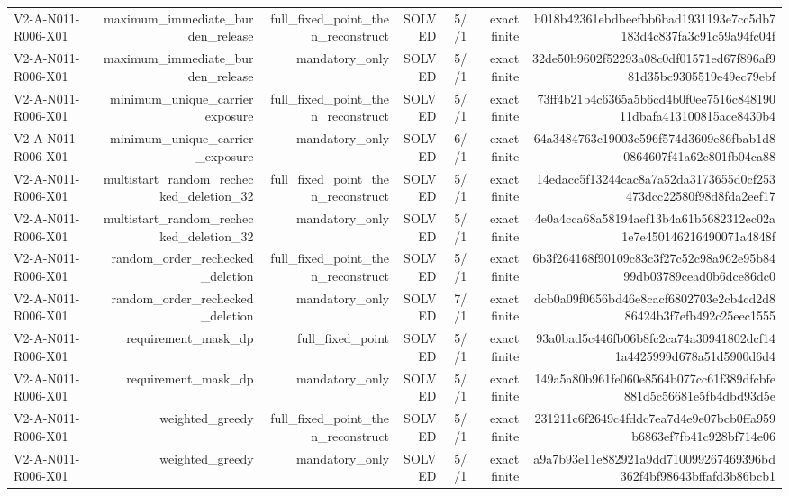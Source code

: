 {\begin{longtable}{lrrrrrr}
V2-A-N011-R006-X01 & maximum\_immediate\_burden\_release & full\_fixed\_point\_then\_reconstruct & SOLVED & 5//1 & exact finite & b018b42361ebdbeefbb6bad1931193e7cc5db7183d4c837fa3c91c59a94fc04f \\
V2-A-N011-R006-X01 & maximum\_immediate\_burden\_release & mandatory\_only & SOLVED & 5//1 & exact finite & 32de50b9602f52293a08c0df01571ed67f896af981d35bc9305519e49ec79ebf \\
V2-A-N011-R006-X01 & minimum\_unique\_carrier\_exposure & full\_fixed\_point\_then\_reconstruct & SOLVED & 5//1 & exact finite & 73ff4b21b4c6365a5b6cd4b0f0ee7516c84819011dbafa413100815ace8430b4 \\
V2-A-N011-R006-X01 & minimum\_unique\_carrier\_exposure & mandatory\_only & SOLVED & 6//1 & exact finite & 64a3484763c19003c596f574d3609e86fbab1d80864607f41a62e801fb04ca88 \\
V2-A-N011-R006-X01 & multistart\_random\_rechecked\_deletion\_32 & full\_fixed\_point\_then\_reconstruct & SOLVED & 5//1 & exact finite & 14edacc5f13244cac8a7a52da3173655d0cf253473dcc22580f98d8fda2eef17 \\
V2-A-N011-R006-X01 & multistart\_random\_rechecked\_deletion\_32 & mandatory\_only & SOLVED & 5//1 & exact finite & 4e0a4cca68a58194aef13b4a61b5682312ec02a1e7e450146216490071a4848f \\
V2-A-N011-R006-X01 & random\_order\_rechecked\_deletion & full\_fixed\_point\_then\_reconstruct & SOLVED & 5//1 & exact finite & 6b3f264168f90109c83c3f27c52c98a962e95b8499db03789cead0b6dce86dc0 \\
V2-A-N011-R006-X01 & random\_order\_rechecked\_deletion & mandatory\_only & SOLVED & 7//1 & exact finite & dcb0a09f0656bd46e8cacf6802703e2cb4cd2d886424b3f7efb492c25eec1555 \\
V2-A-N011-R006-X01 & requirement\_mask\_dp & full\_fixed\_point & SOLVED & 5//1 & exact finite & 93a0bad5c446fb06b8fc2ca74a30941802dcf141a4425999d678a51d5900d6d4 \\
V2-A-N011-R006-X01 & requirement\_mask\_dp & mandatory\_only & SOLVED & 5//1 & exact finite & 149a5a80b961fe060e8564b077cc61f389dfcbfe881d5c56681e5fb4dbd93d5e \\
V2-A-N011-R006-X01 & weighted\_greedy & full\_fixed\_point\_then\_reconstruct & SOLVED & 5//1 & exact finite & 231211c6f2649c4fddc7ea7d4e9e07bcb0ffa959b6863ef7fb41c928bf714e06 \\
V2-A-N011-R006-X01 & weighted\_greedy & mandatory\_only & SOLVED & 5//1 & exact finite & a9a7b93e11e882921a9dd710099267469396bd362f4bf98643bffafd3b86bcb1 \\

\end{longtable}}
